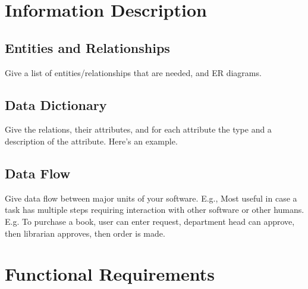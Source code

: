 \documentclass[a4wide]{article}
\begin{document}
\section{Information Description}

\subsection{Entities and Relationships}

Give a list of entities/relationships that are needed,
and ER diagrams.

\subsection{Data Dictionary}

Give the relations, their attributes, and for each attribute the
type and a description of the attribute.  Here's an example.


\subsection{Data Flow}

Give data flow between major units of your software.
E.g., 
Most useful in case a task has multiple steps requiring interaction
with other software or other humans.
E.g. To purchase a book, user can enter request, department head can
approve, then librarian approves, then order is made.

\section{Functional Requirements}
\end{document}
